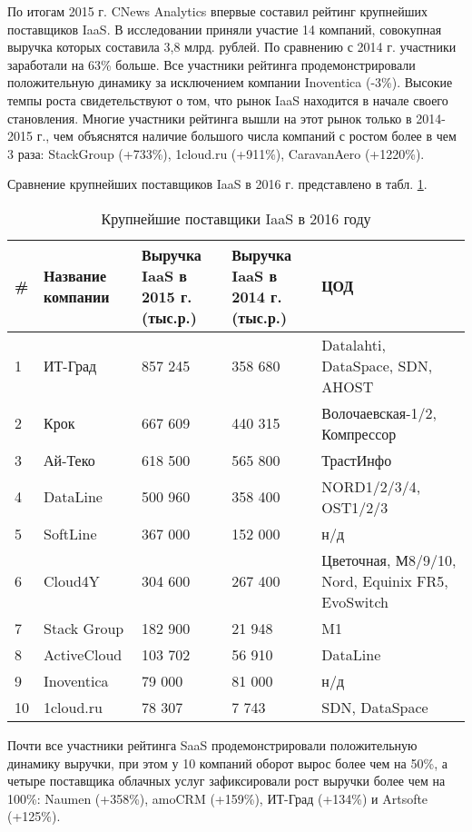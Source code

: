 По итогам 2015 г. CNews Analytics впервые составил рейтинг крупнейших поставщиков IaaS.
В исследовании приняли участие 14 компаний, совокупная выручка которых составила 3,8 млрд. рублей.
По сравнению с 2014 г. участники заработали на 63\% больше.
Все участники рейтинга продемонстрировали положительную динамику за исключением компании Inoventica (-3\%).
Высокие темпы роста свидетельствуют о том, что рынок IaaS находится в начале своего становления.
Многие участники рейтинга вышли на этот рынок только в 2014-2015 г., чем объяснятся наличие большого числа компаний с ростом более в чем 3 раза: StackGroup (+733\%), 1cloud.ru (+911\%), CaravanAero (+1220\%).

Сравнение крупнейших поставщиков IaaS в 2016 г. \cite{cnews} представлено в табл. \ref{iaas-table}.
\begin{table}[H]
  \caption{Крупнейшие поставщики IaaS в 2016 году}\label{iaas-table}
  \begin{tabular}{|p{0.5cm}|p{2.5cm}|p{3.5cm}|p{3.5cm}|p{4.5cm}|}
  \hline \# & Название компании & Выручка IaaS в 2015 г. (тыс.р.) & Выручка IaaS в 2014 г. (тыс.р.) & ЦОД \\
  \hline 1 & ИТ-Град & 857 245 & 358 680 & Datalahti, DataSpace, SDN, AHOST \\
  \hline 2 & Крок & 667 609 & 440 315 & Волочаевская-1/2, Компрессор \\
  \hline 3 & Ай-Теко & 618 500 & 565 800 & ТрастИнфо \\
  \hline 4 & DataLine & 500 960 & 358 400 & NORD1/2/3/4, OST1/2/3 \\
  \hline 5 & SoftLine & 367 000 & 152 000 & н/д \\
  \hline 6 & Cloud4Y & 304 600 & 267 400 & Цветочная, М8/9/10, Nord, Equinix FR5, EvoSwitch \\
  \hline 7 & Stack Group & 182 900 & 21 948 & M1 \\
  \hline 8 & ActiveCloud & 103 702 & 56 910 & DataLine \\
  \hline 9 & Inoventica & 79 000 & 81 000 & н/д \\
  \hline 10 & 1cloud.ru & 78 307 & 7 743 & SDN, DataSpace \\
  \hline
  \end{tabular}
\end{table}

Почти все участники рейтинга SaaS продемонстрировали положительную динамику выручки, при этом у 10 компаний оборот вырос более чем на 50\%, а четыре поставщика облачных услуг зафиксировали рост выручки более чем на 100\%: Naumen (+358\%), amoCRM (+159\%), ИТ-Град (+134\%) и Artsofte (+125\%).

